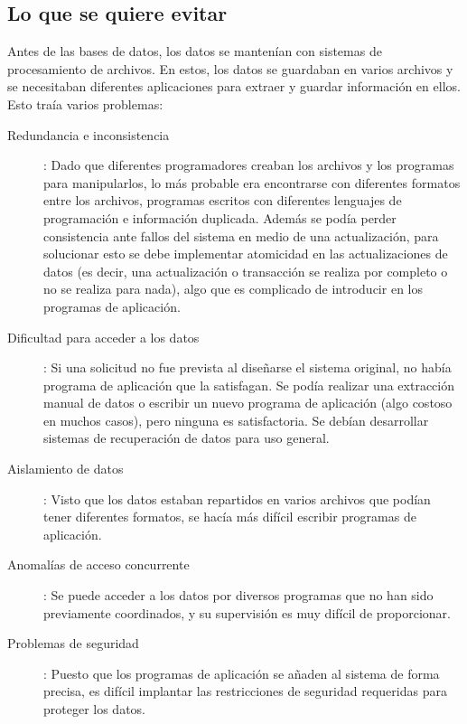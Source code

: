 \documentclass[a4paper]{article}
\begin{document}
\subsection{Lo que se quiere evitar}
Antes de las bases de datos, los datos se mantenían con sistemas de procesamiento de archivos.
En estos, los datos se guardaban en varios archivos y se necesitaban diferentes aplicaciones para
extraer y guardar información en ellos. Esto traía varios problemas:
\begin{description}
    \item[Redundancia e inconsistencia]: Dado que diferentes programadores creaban los archivos y
    los programas para manipularlos, lo más probable era encontrarse con diferentes formatos
    entre los archivos, programas escritos con diferentes lenguajes de programación e información
    duplicada. Además se podía perder consistencia ante fallos del sistema en medio de una
    actualización, para solucionar esto se debe implementar atomicidad en las actualizaciones
    de datos (es decir, una actualización o transacción se realiza por completo o no se realiza
    para nada), algo que es complicado de introducir en los programas de aplicación.
    \item[Dificultad para acceder a los datos]: Si una solicitud no fue prevista al diseñarse el
    sistema original, no había programa de aplicación que la satisfagan. Se podía realizar una
    extracción manual de datos o escribir un nuevo programa de aplicación (algo costoso en muchos
    casos), pero ninguna es satisfactoria. Se debían desarrollar sistemas de recuperación de datos
    para uso general.
    \item[Aislamiento de datos]: Visto que los datos estaban repartidos en varios archivos que
    podían tener diferentes formatos, se hacía más difícil escribir programas de aplicación.
    \item[Anomalías de acceso concurrente]: Se puede acceder a los datos por diversos programas
    que no han sido previamente coordinados, y su supervisión es muy difícil de proporcionar.
    \item[Problemas de seguridad]: Puesto que los programas de aplicación se añaden al sistema
    de forma precisa, es difícil implantar las restricciones de seguridad requeridas para
    proteger los datos.
\end{description}
\end{document}
